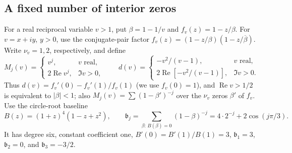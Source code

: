 \documentclass[11pt]{article}
\theoremstyle{remark}\newtheorem{remark}[theorem]{Remark}
\newcommand{\Rea}{\operatorname{Re}}
\begin{document}
\subsection{A fixed number of interior zeros}
For a real reciprocal variable \(v>1\), put
\(\beta=1-1/v\) and \(f_v(z)=1-z/\beta\). For \(v=x+iy\),
\(y>0\), use the conjugate-pair factor
\(f_v(z)=(1-z/\beta)(1-z/\overline\beta)\).
Write \(\nu_v=1,2\), respectively, and define
\[
 M_j(v)=\begin{cases}v^j,&v\text{ real},\\2\Rea v^j,&\Im v>0,\end{cases}
 \qquad
 d(v)=\begin{cases}-v^2/(v-1),&v\text{ real},\\
 2\Rea[-v^2/(v-1)],&\Im v>0.\end{cases}
\]
Thus \(d(v)=f_v'(0)-f_v'(1)/f_v(1)\) (we use \(f_v(0)=1\)), and
\(\Rea v>1/2\) is equivalent to \(|\beta|<1\); also
\(M_j(v)=\sum(1-\beta')^{-j}\) over the \(\nu_v\) zeros \(\beta'\) of \(f_v\).
Use the circle-root baseline
\[
 B(z)=(1+z)^4(1-z+z^2),\qquad
 \mathfrak b_j=\sum_{\beta:\,B(\beta)=0}(1-\beta)^{-j}
 =4\cdot2^{-j}+2\cos(j\pi/3).
\]
It has degree six, constant coefficient one,
\(B'(0)=B'(1)/B(1)=3\), \(\mathfrak b_1=3\), \(\mathfrak b_2=0\), and
\(\mathfrak b_3=-3/2\).
\end{document}
